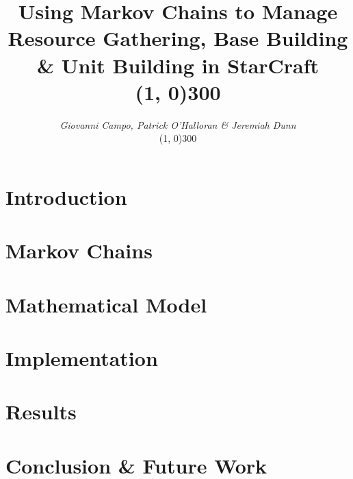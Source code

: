 \documentclass[12pt]{article}
\title{Using Markov Chains to Manage Resource Gathering, Base Building \& Unit Building in StarCraft\\\vspace{0.8cm}
\line(1, 0){300}\vspace{-0.3cm}
}
\author
{\textit{Giovanni Campo, Patrick O'Halloran \& Jeremiah Dunn}\vspace{0.3cm}\\\vspace{0.1cm}\line(1, 0){300}\vspace{2.3cm}}
\date{}
\newenvironment{sciabstract}{%
\begin{quote} \bf}
{\end{quote}}
\begin{document}
 

\baselineskip24pt


\maketitle 




\begin{sciabstract}
 	
 	\vspace{1.0cm}
\end{sciabstract}


\section{Introduction}




\section{Markov Chains}



\section{Mathematical Model}



\section{Implementation}




\section{Results}



\section{Conclusion \& Future Work}





\newpage


\label{endpage}

\begin{appendices}

\end{appendices}
\end{document}

